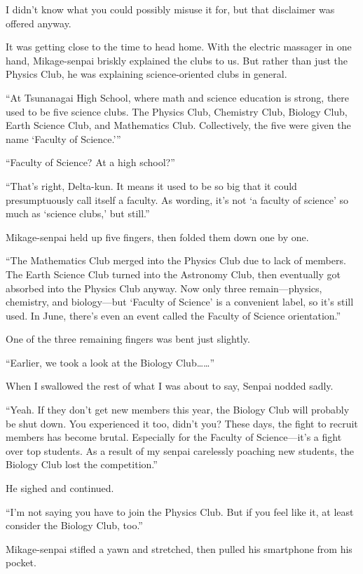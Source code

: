 \documentclass[
    a4paper,
    12pt,
    twoside,
    openany,
    UTF8,
    fontset=windows
]{ctexbook}
\begin{document}
I didn't know what you could possibly misuse it for, but that disclaimer was offered anyway.

It was getting close to the time to head home. With the electric massager in one hand, Mikage-senpai briskly explained the clubs to us. But rather than just the Physics Club, he was explaining science-oriented clubs in general.

``At Tsunanagai High School, where math and science education is strong, there used to be five science clubs. The Physics Club, Chemistry Club, Biology Club, Earth Science Club, and Mathematics Club. Collectively, the five were given the name `Faculty of Science.'''

``Faculty of Science? At a high school?''

``That's right, Delta-kun. It means it used to be so big that it could presumptuously call itself a faculty. As wording, it's not `a faculty of science' so much as `science clubs,' but still.''

Mikage-senpai held up five fingers, then folded them down one by one.

``The Mathematics Club merged into the Physics Club due to lack of members. The Earth Science Club turned into the Astronomy Club, then eventually got absorbed into the Physics Club anyway. Now only three remain---physics, chemistry, and biology---but `Faculty of Science' is a convenient label, so it's still used. In June, there's even an event called the Faculty of Science orientation.''

One of the three remaining fingers was bent just slightly.

``Earlier, we took a look at the Biology Club\dots\dots''

When I swallowed the rest of what I was about to say, Senpai nodded sadly.

``Yeah. If they don't get new members this year, the Biology Club will probably be shut down. You experienced it too, didn't you? These days, the fight to recruit members has become brutal. Especially for the Faculty of Science---it's a fight over top students. As a result of my senpai carelessly poaching new students, the Biology Club lost the competition.''

He sighed and continued.

``I'm not saying you have to join the Physics Club. But if you feel like it, at least consider the Biology Club, too.''

Mikage-senpai stifled a yawn and stretched, then pulled his smartphone from his pocket.
\end{document}
